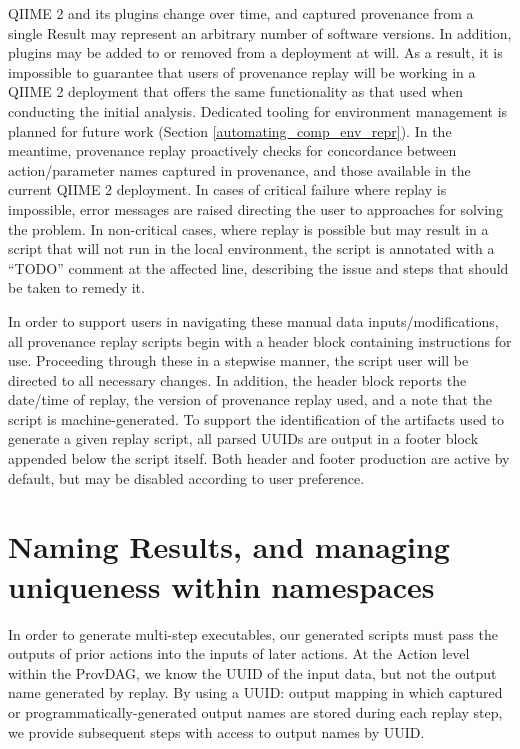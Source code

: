 QIIME 2 and its plugins change over time, and captured provenance from a single
Result may represent an arbitrary number of software versions. In addition,
plugins may be added to or removed from a deployment at will. As a result, it is
impossible to guarantee that users of provenance replay will be working in a
QIIME 2 deployment that offers the same functionality as that used when
conducting the initial analysis. Dedicated tooling for environment management is
planned for future work (Section \ref{automating_comp_env_repr}). In the
meantime, provenance replay proactively checks for concordance between
action/parameter names captured in provenance, and those available in the
current QIIME 2 deployment. In cases of critical failure where replay is
impossible, error messages are raised directing the user to approaches for
solving the problem. In non-critical cases, where replay is possible but may
result in a script that will not run in the local environment, the script is
annotated with a “TODO” comment at the affected line, describing the issue and
steps that should be taken to remedy it.

In order to support users in navigating these manual data inputs/modifications,
all provenance replay scripts begin with a header block containing instructions
for use. Proceeding through these in a stepwise manner, the script user will be
directed to all necessary changes. In addition, the header block reports the
date/time of replay, the version of provenance replay used, and a note that the
script is machine-generated. To support the identification of the artifacts used
to generate a given replay script, all parsed UUIDs are output in a footer block
appended below the script itself. Both header and footer production are active
by default, but may be disabled according to user preference.


\section{Naming Results, and managing uniqueness within namespaces}

In order to generate multi-step executables, our generated scripts must pass the
outputs of prior actions into the inputs of later actions. At the Action level
within the ProvDAG, we know the UUID of the input data, but not the output name
generated by replay. By using a {UUID: output} mapping in which captured or
programmatically-generated output names are stored during each replay step, we
provide subsequent steps with access to output names by UUID.

